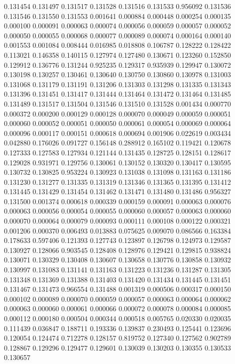 0.131454
0.131497
0.131517
0.131528
0.131516
0.131533
0.956092
0.131536
0.131546
0.131550
0.131553
0.001641
0.000884
0.000448
0.000254
0.000135
0.000100
0.000091
0.000063
0.000074
0.000056
0.000059
0.000057
0.000052
0.000050
0.000055
0.000068
0.000077
0.000089
0.000074
0.000164
0.000140
0.001553
0.001084
0.008444
0.016985
0.018808
0.106787
0.128222
0.128422
0.113021
0.146358
0.140115
0.127974
0.127480
0.130671
0.123260
0.152850
0.129912
0.136776
0.131244
0.925235
0.129317
0.935939
0.129947
0.130072
0.130198
0.130257
0.130461
0.130640
0.130750
0.130860
0.130978
0.131003
0.131068
0.131179
0.131191
0.131206
0.131303
0.131298
0.131335
0.131343
0.131396
0.131451
0.131417
0.131444
0.131464
0.131472
0.131464
0.131485
0.131489
0.131517
0.131504
0.131546
0.131510
0.131528
0.001434
0.000770
0.000372
0.000200
0.000129
0.000128
0.000070
0.000049
0.000059
0.000051
0.000060
0.000052
0.000051
0.000050
0.000061
0.000054
0.000069
0.000064
0.000096
0.000117
0.000151
0.000618
0.000694
0.001906
0.022619
0.003434
0.042880
0.176026
0.091727
0.156148
0.288912
0.165102
0.119421
0.120678
0.127333
0.127583
0.127934
0.121144
0.131435
0.128725
0.128151
0.128617
0.129028
0.931971
0.129756
0.130061
0.130152
0.130320
0.130417
0.130595
0.130732
0.130825
0.953224
0.130923
0.131038
0.131098
0.131163
0.131186
0.131230
0.131277
0.131335
0.131319
0.131346
0.131365
0.131395
0.131412
0.131445
0.131429
0.131454
0.131462
0.131471
0.131480
0.131486
0.956327
0.131500
0.001374
0.000618
0.000339
0.000159
0.000091
0.000063
0.000076
0.000063
0.000056
0.000054
0.000055
0.000060
0.000057
0.000063
0.000060
0.000070
0.000064
0.000079
0.000093
0.000111
0.000108
0.000122
0.000321
0.001206
0.000370
0.006493
0.013883
0.075625
0.009070
0.086566
0.163384
0.178633
0.597406
0.121393
0.127743
0.123897
0.126798
0.124973
0.129587
0.130927
0.128066
0.903545
0.128408
0.128976
0.129421
0.129815
0.938824
0.130071
0.130329
0.130408
0.130607
0.130658
0.130776
0.130858
0.130932
0.130997
0.131083
0.131141
0.131163
0.131223
0.131236
0.131287
0.131305
0.131348
0.131369
0.131388
0.131403
0.131420
0.131434
0.131445
0.131451
0.131467
0.131473
0.966554
0.131488
0.001319
0.000506
0.000317
0.000150
0.000102
0.000089
0.000070
0.000059
0.000057
0.000063
0.000064
0.000062
0.000063
0.000060
0.000061
0.000066
0.000072
0.000078
0.000084
0.000085
0.000112
0.000180
0.000504
0.000344
0.000518
0.005765
0.020330
0.020035
0.111439
0.036847
0.188711
0.193336
0.139837
0.230493
0.125441
0.123696
0.120054
0.124474
0.712278
0.128157
0.819752
0.127340
0.127562
0.902789
0.128867
0.129296
0.129477
0.129601
0.130039
0.130203
0.130355
0.130533
0.130657
